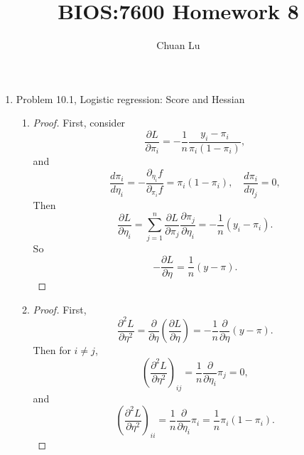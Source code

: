 \documentclass{article}
\begin{document}
\author{Chuan Lu}
\title{BIOS:7600 Homework 8}
\maketitle

\medskip

\begin{enumerate}

\item Problem 10.1, Logistic regression: Score and Hessian
\begin{enumerate}
\item 
\begin{proof}
First, consider
\begin{equation}
\frac{\partial L}{\partial \pi_i} = -\frac{1}{n}\frac{y_i - \pi_i}{\pi_i(1-\pi_i)},
\end{equation}
and
\begin{equation}
\frac{d\pi_i}{d\eta_i} = -\frac{\partial_{\eta_i} f}{\partial_{\pi_i} f} = \pi_i(1-\pi_i), \quad 
\frac{d\pi_i}{d\eta_j} = 0,
\end{equation}
Then
\begin{equation}
\frac{\partial L}{\partial \eta_i} = \sum_{j = 1}^{n}\frac{\partial L}{\partial \pi_j}\frac{\partial \pi_j}{\partial \eta_i} = -\frac{1}{n}(y_i - \pi_i).
\end{equation}
So
\begin{equation}
-\frac{\partial L}{\partial \eta} = \frac{1}{n}(y-\pi).
\end{equation}
\end{proof}

\item
\begin{proof}
First,
\begin{equation}
\frac{\partial^2 L}{\partial \eta^2} = \frac{\partial}{\partial \eta}(\frac{\partial L}{\partial \eta}) = -\frac{1}{n}\frac{\partial }{\partial \eta}(y - \pi).
\end{equation}
Then for $i\ne j$,
\begin{equation}
\left(\frac{\partial^2 L}{\partial\eta^2}\right)_{ij} = \frac{1}{n}\frac{\partial}{\partial \eta_i}\pi_j = 0,
\end{equation}
and
\begin{equation}
\left(\frac{\partial^2 L}{\partial\eta^2}\right)_{ii} = \frac{1}{n}\frac{\partial}{\partial \eta_i}\pi_i = \frac{1}{n}\pi_i(1-\pi_i).
\end{equation}

\end{proof}



\end{enumerate}
\end{enumerate}
\end{document}
